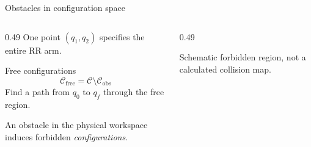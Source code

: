 \documentclass[aspectratio=169]{beamer}
\begin{document}
\begin{frame}[t]{Obstacles in configuration space}
    \small
    \begin{columns}[T,onlytextwidth]
        \begin{column}{0.49\textwidth}
            One point $(q_1,q_2)$ specifies the entire RR arm.
            \begin{block}{Free configurations}
                \[\mathcal C_{\mathrm{free}}=\mathcal C\setminus\mathcal C_{\mathrm{obs}}\]
                Find a path from $q_0$ to $q_f$ through the free region.
            \end{block}
            An obstacle in the physical workspace induces forbidden \emph{configurations}.
        \end{column}
        \begin{column}{0.49\textwidth}
            \centering
            \par\scriptsize Schematic forbidden region, not a calculated collision map.
        \end{column}
    \end{columns}
\end{frame}
\end{document}
